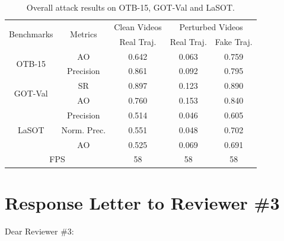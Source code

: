 \documentclass[12pt]{article}
\begin{document}
\begin{table}[h]
    \centering
    \caption{Overall attack results on OTB-15, GOT-Val and LaSOT.}
    \begin{tabular}{c c | c | c | c}
    \toprule
    \multirow{2}{*}[-2pt]{Benchmarks} & \multirow{2}{*}[-2pt]{Metrics} & Clean Videos    & \multicolumn{2}{c}{Perturbed Videos}  \\
    \cmidrule{3-5}
                              &                         & Real Traj. & Real Traj. & Fake Traj.     \\ 
    \midrule
    \multirow{2}{*}{OTB-15} 
    & AO   & 0.642 & 0.063 & 0.759\\
    & Precision & 0.861 & 0.092 & 0.795\\
    \midrule
    \multirow{2}{*}{GOT-Val} 
    & SR & 0.897 & 0.123 & 0.890\\
    & AO & 0.760 & 0.153 & 0.840 \\
    \midrule
    \multirow{3}{*}{LaSOT} 
    & Precision  & 0.514 & 0.046 & 0.605\\
    & Norm. Prec.& 0.551 & 0.048 & 0.702\\
    & AO         & 0.525 & 0.069 & 0.691\\
    \midrule
    \multicolumn{2}{c|}{FPS} & 58 & 58 & 58\\
    \bottomrule
    \end{tabular}
    \label{tab:benchmark results}
  \end{table}

\clearpage
\newpage
{\centering\section*{Response Letter to Reviewer \#3}}
\noindent Dear Reviewer \#3:
\end{document}
